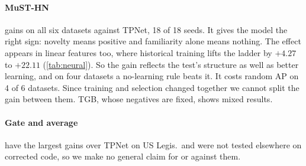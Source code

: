 \documentclass[11pt,a4paper]{article}
\theoremstyle{plain}
\theoremstyle{definition}
\begin{document}
\paragraph{MuST-HN} gains on all six datasets against TPNet, 18 of 18 seeds. It gives the model the right sign: novelty means positive and familiarity alone means nothing. The effect appears in linear features too, where historical training lifts the ladder by $+4.27$ to $+22.11$ (\cref{tab:neural}). So the gain reflects the test's structure as well as better learning, and on four datasets a no-learning rule beats it. It costs random AP on 4 of 6 datasets. Since training and selection changed together we cannot split the gain between them. TGB, whose negatives are fixed, shows mixed results.

\paragraph{Gate and average} have the largest gains over TPNet on US Legis.\ and were not tested elsewhere on corrected code, so we make no general claim for or against them.
\end{document}
